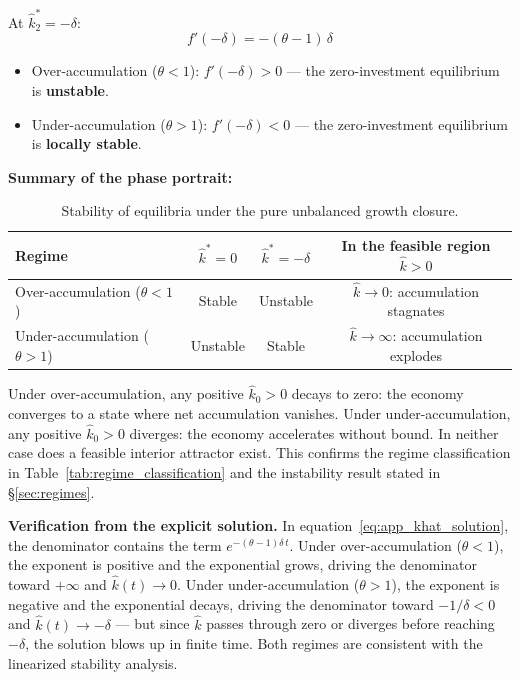 At $\hat{k}_2^* = -\delta$:
%
\begin{equation}
	f'(-\delta) = -(\theta - 1)\,\delta
\end{equation}
%
\begin{itemize}
	\item Over-accumulation ($\theta < 1$): $f'(-\delta) > 0$ — the zero-investment equilibrium is \textbf{unstable}.
	\item Under-accumulation ($\theta > 1$): $f'(-\delta) < 0$ — the zero-investment equilibrium is \textbf{locally stable}.
\end{itemize}

\textbf{Summary of the phase portrait:}

\begin{table}[H]
	\centering
	\caption{Stability of equilibria under the pure unbalanced growth closure.}
	\begin{tabular}{lccc}
		\toprule
		Regime & $\hat{k}^* = 0$ & $\hat{k}^* = -\delta$ & \textbf{In the feasible region $\hat{k} > 0$} \\
		\midrule
		Over-accumulation ($\theta < 1$) & Stable & Unstable & $\hat{k} \to 0$: accumulation stagnates \\
		Under-accumulation ($\theta > 1$) & Unstable & Stable & $\hat{k} \to \infty$: accumulation explodes \\
		\bottomrule
	\end{tabular}
	\label{tab:app_stability}
\end{table}

Under over-accumulation, any positive $\hat{k}_0 > 0$ decays to zero: the economy converges to a state where net accumulation vanishes. Under under-accumulation, any positive $\hat{k}_0 > 0$ diverges: the economy accelerates without bound. In neither case does a feasible interior attractor exist. This confirms the regime classification in Table~\ref{tab:regime_classification} and the instability result stated in \S\ref{sec:regimes}.

\textbf{Verification from the explicit solution.} In equation~\eqref{eq:app_khat_solution}, the denominator contains the term $e^{-(\theta-1)\delta\,t}$. Under over-accumulation ($\theta < 1$), the exponent is positive and the exponential grows, driving the denominator toward $+\infty$ and $\hat{k}(t) \to 0$. Under under-accumulation ($\theta > 1$), the exponent is negative and the exponential decays, driving the denominator toward $-1/\delta < 0$ and $\hat{k}(t) \to -\delta$ — but since $\hat{k}$ passes through zero or diverges before reaching $-\delta$, the solution blows up in finite time. Both regimes are consistent with the linearized stability analysis.

